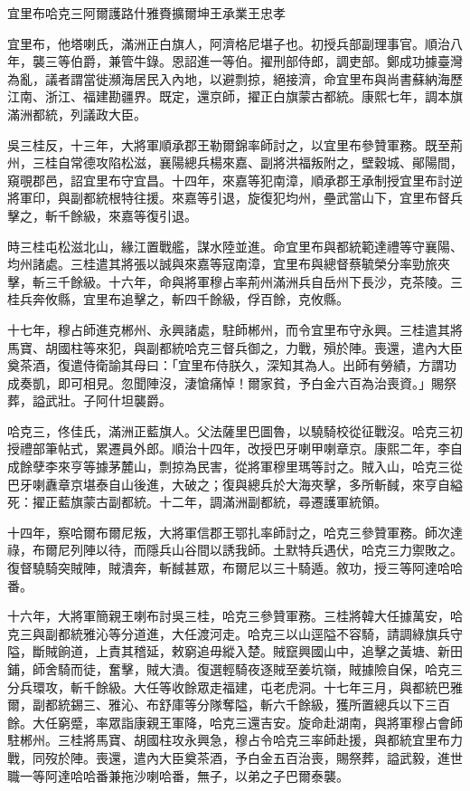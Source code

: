 
\begin{pinyinscope}
宜里布哈克三阿爾護路什雅賚擴爾坤王承業王忠孝

宜里布，他塔喇氏，滿洲正白旗人，阿濟格尼堪子也。初授兵部副理事官。順治八年，襲三等伯爵，兼管牛錄。恩詔進一等伯。擢刑部侍郎，調吏部。鄭成功據臺灣為亂，議者謂當徙瀕海居民入內地，以避剽掠，絕接濟，命宜里布與尚書蘇納海歷江南、浙江、福建勘疆界。既定，還京師，擢正白旗蒙古都統。康熙七年，調本旗滿洲都統，列議政大臣。

吳三桂反，十三年，大將軍順承郡王勒爾錦率師討之，以宜里布參贊軍務。既至荊州，三桂自常德攻陷松滋，襄陽總兵楊來嘉、副將洪福叛附之，壁穀城、鄖陽間，窺覗郡邑，詔宜里布守宜昌。十四年，來嘉等犯南漳，順承郡王承制授宜里布討逆將軍印，與副都統根特往援。來嘉等引退，旋復犯均州，壘武當山下，宜里布督兵擊之，斬千餘級，來嘉等復引退。

時三桂屯松滋北山，緣江置戰艦，謀水陸並進。命宜里布與都統範達禮等守襄陽、均州諸處。三桂遣其將張以誠與來嘉等寇南漳，宜里布與總督蔡毓榮分率勁旅夾擊，斬三千餘級。十六年，命與將軍穆占率荊州滿洲兵自岳州下長沙，克茶陵。三桂兵奔攸縣，宜里布追擊之，斬四千餘級，俘百餘，克攸縣。

十七年，穆占師進克郴州、永興諸處，駐師郴州，而令宜里布守永興。三桂遣其將馬寶、胡國柱等來犯，與副都統哈克三督兵御之，力戰，殞於陣。喪還，遣內大臣奠茶酒，復遣侍衛諭其母曰：「宜里布侍朕久，深知其為人。出師有勞績，方謂功成奏凱，即可相見。忽聞陣沒，淒愴痛悼！爾家貧，予白金六百為治喪資。」賜祭葬，謚武壯。子阿什坦襲爵。

哈克三，佟佳氏，滿洲正藍旗人。父法薩里巴圖魯，以驍騎校從征戰沒。哈克三初授禮部筆帖式，累遷員外郎。順治十四年，改授巴牙喇甲喇章京。康熙二年，李自成餘孽李來亨等據茅麓山，剽掠為民害，從將軍穆里瑪等討之。賊入山，哈克三從巴牙喇纛章京堪泰自山後進，大破之；復與總兵於大海夾擊，多所斬馘，來亨自縊死：擢正藍旗蒙古副都統。十二年，調滿洲副都統，尋遷護軍統領。

十四年，察哈爾布爾尼叛，大將軍信郡王鄂扎率師討之，哈克三參贊軍務。師次達祿，布爾尼列陣以待，而隱兵山谷間以誘我師。土默特兵遇伏，哈克三力禦敗之。復督驍騎突賊陣，賊潰奔，斬馘甚眾，布爾尼以三十騎遁。敘功，授三等阿達哈哈番。

十六年，大將軍簡親王喇布討吳三桂，哈克三參贊軍務。三桂將韓大任據萬安，哈克三與副都統雅沁等分道進，大任渡河走。哈克三以山逕隘不容騎，請調綠旗兵守隘，斷賊餉道，上責其稽延，敕窮追毋縱入楚。賊竄興國山中，追擊之黃塘、新田鋪，師舍騎而徒，奮擊，賊大潰。復選輕騎夜逐賊至姜坑嶺，賊據險自保，哈克三分兵環攻，斬千餘級。大任等收餘眾走福建，屯老虎洞。十七年三月，與都統巴雅爾，副都統錫三、雅沁、布舒庫等分隊奪隘，斬六千餘級，獲所置總兵以下三百餘。大任窮蹙，率眾詣康親王軍降，哈克三還吉安。旋命赴湖南，與將軍穆占會師駐郴州。三桂將馬寶、胡國柱攻永興急，穆占令哈克三率師赴援，與都統宜里布力戰，同歿於陣。喪還，遣內大臣奠茶酒，予白金五百治喪，賜祭葬，謚武毅，進世職一等阿達哈哈番兼拖沙喇哈番，無子，以弟之子巴爾泰襲。


\end{pinyinscope}
